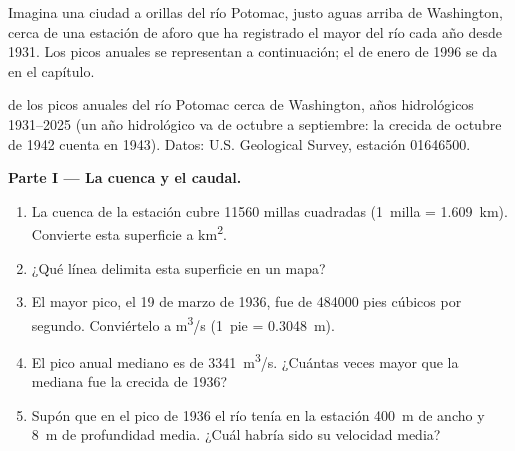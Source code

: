 \begin{problem}
\label{pb:g10:drainage-basins:1}
Imagina una ciudad a orillas del río Potomac, justo aguas arriba de
Washington, cerca de una estación de aforo que ha registrado el mayor 
del río cada año desde 1931. Los picos anuales se representan a continuación;
el  de enero de 1996 se da en el capítulo.

\begin{center}

{\small {} de los picos anuales del río Potomac cerca de Washington,
años hidrológicos 1931--2025 (un año hidrológico va de octubre a septiembre:
la crecida de octubre de 1942 cuenta en 1943). Datos: U.S. Geological Survey,
estación 01646500.}
\end{center}

\medskip
\noindent\textbf{Parte I --- La cuenca y el caudal.}
\begin{enumerate}
  \item La cuenca de la estación cubre \num{11560} millas cuadradas
        (\num{1}~milla = \qty{1.609}{km}). Convierte esta superficie a
        \unit{km^2}.
  \item ¿Qué línea delimita esta superficie en un mapa?
  \item El mayor pico, el 19 de marzo de 1936, fue de \num{484000} pies
        cúbicos por segundo. Conviértelo a \unit{m^3/s} (\num{1}~pie =
        \qty{0.3048}{m}).
  \item El pico anual mediano es de \qty{3341}{m^3/s}. ¿Cuántas veces mayor
        que la mediana fue la crecida de 1936?
  \item Supón que en el pico de 1936 el río tenía en la estación \qty{400}{m}
        de ancho y \qty{8}{m} de profundidad media. ¿Cuál habría sido su
        velocidad media?
\end{enumerate}


\end{problem}
